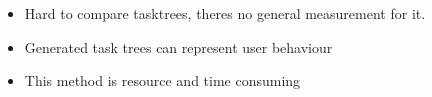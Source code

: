 \begin{itemize}
	\item Hard to compare tasktrees, theres no general measurement for it.
	\item Generated task trees can represent user behaviour
	\item This method is resource and time consuming 
\end{itemize}
